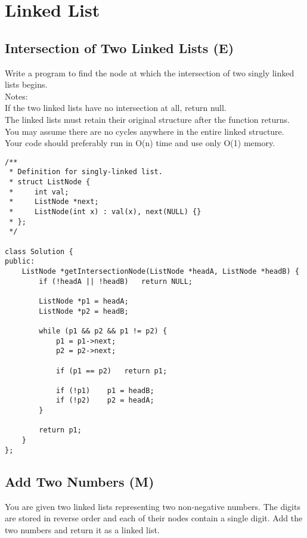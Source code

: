 \chapter{Linked List}
\section{Intersection of Two Linked Lists (E)}
Write a program to find the node at which the intersection of two singly linked lists begins.\\

Notes:\\
    If the two linked lists have no intersection at all, return null.\\
    The linked lists must retain their original structure after the function returns.\\
    You may assume there are no cycles anywhere in the entire linked structure.\\
    Your code should preferably run in O(n) time and use only O(1) memory.\\
 
\begin{lstlisting}
/**
 * Definition for singly-linked list.
 * struct ListNode {
 *     int val;
 *     ListNode *next;
 *     ListNode(int x) : val(x), next(NULL) {}
 * };
 */
 
class Solution {
public:
    ListNode *getIntersectionNode(ListNode *headA, ListNode *headB) {
        if (!headA || !headB)   return NULL;
        
        ListNode *p1 = headA;
        ListNode *p2 = headB;
        
        while (p1 && p2 && p1 != p2) {
            p1 = p1->next;
            p2 = p2->next;
            
            if (p1 == p2)   return p1;
            
            if (!p1)    p1 = headB;
            if (!p2)    p2 = headA;
        }
        
        return p1;
    }
};
\end{lstlisting}


\section{Add Two Numbers (M)}
You are given two linked lists representing two non-negative numbers. The digits are stored in reverse order and each of their nodes contain a single digit. Add the two numbers and return it as a linked list.\\

